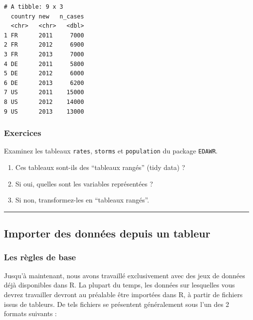 \documentclass[
  a4paper,
]{article}
\providecommand{\tightlist}{%
  \setlength{\itemsep}{0pt}\setlength{\parskip}{0pt}}
\begin{document}
\begin{verbatim}
# A tibble: 9 x 3
  country new   n_cases
  <chr>   <chr>   <dbl>
1 FR      2011     7000
2 FR      2012     6900
3 FR      2013     7000
4 DE      2011     5800
5 DE      2012     6000
6 DE      2013     6200
7 US      2011    15000
8 US      2012    14000
9 US      2013    13000
\end{verbatim}

\hypertarget{Exo-9}{%
\subsubsection{Exercices}\label{Exo-9}}

Examinez les tableaux \texttt{rates}, \texttt{storms} et \texttt{population} du package \texttt{EDAWR}.

\begin{enumerate}
\def\labelenumi{\arabic{enumi}.}
\tightlist
\item
  Ces tableaux sont-ils des ``tableaux rangés'' (tidy data) ?
\item
  Si oui, quelles sont les variables représentées ?
\item
  Si non, transformez-les en ``tableaux rangés''.
\end{enumerate}

\begin{center}\rule{0.5\linewidth}{0.5pt}\end{center}

\hypertarget{importer-des-donnuxe9es-depuis-un-tableur}{%
\subsection{Importer des données depuis un tableur}\label{importer-des-donnuxe9es-depuis-un-tableur}}

\hypertarget{les-ruxe8gles-de-base}{%
\subsubsection{Les règles de base}\label{les-ruxe8gles-de-base}}

Jusqu'à maintenant, nous avons travaillé exclusivement avec des jeux de données déjà disponibles dans R. La plupart du temps, les données sur lesquelles vous devrez travailler devront au préalable être importées dans R, à partir de fichiers issus de tableurs. De tels fichiers se présentent généralement sous l'un des 2 formats suivants :
\end{document}
